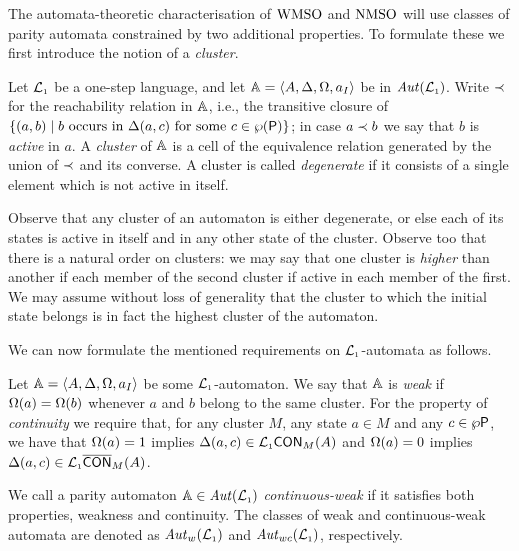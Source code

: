 The automata-theoretic characterisation of $\mathrm{WMSO}$ and $\mathrm{NMSO}$ will use classes 
of parity automata constrained by two additional properties.
To formulate these we first introduce the notion of a \emph{cluster}.

\begin{definition}
\label{d:wk}
\label{d:ctwk}
Let $\mathcal{L}_{\scriptscriptstyle 1}$ be a one-step language, and let $\mathbb{A} = \langle{A,\Delta,\Omega,a_I}\rangle$
be in $\mathit{Aut}(\mathcal{L}_{\scriptscriptstyle 1})$. 
Write $\prec$ for the reachability relation in $\mathbb{A}$, i.e., the transitive 
closure of $\{ (a,b) \mid b \text{ occurs in }\tmap(a,c) \text{ for 
some } c \in \wp(\props) \}$;
in case $a \prec b$ we say that $b$ is \emph{active} in $a$.
A \emph{cluster} of $\mathbb{A}$ is a cell of the equivalence relation generated by 
the union of $\prec$ and its converse.
A cluster is called \emph{degenerate} if it consists of a  single element which
is not active in itself.
\end{definition}

Observe that any cluster of an automaton is either degenerate, or else each
of its states is active in itself and in any other state of the cluster.
Observe too that there is a natural order on clusters: we may say that one
cluster is \emph{higher} than another if each member of the second cluster
if active in each member of the first.
We may assume without loss of generality that the cluster to which the initial 
state belongs is in fact the highest cluster of the automaton.

We can now formulate the mentioned requirements on $\mathcal{L}_{\scriptscriptstyle 1}$-automata as follows.

\begin{definition}
\label{d:wk}
\label{d:ctwk}
Let $\mathbb{A} = \langle{A,\Delta,\Omega,a_I}\rangle$ be some $\mathcal{L}_{\scriptscriptstyle 1}$-automaton.
We say that $\mathbb{A}$ is \emph{weak} if $\Omega(a) = \Omega(b)$ whenever $a$ and $b$
belong to the same cluster.
For the property of \emph{continuity} we require that, for any cluster $M$, any
state $a \in M$ and any $c \in \wp\mathsf{P}$, we have that 
$\Omega(a) = 1$ implies $\Delta(a,c) \in \mathcal{L}_{\scriptscriptstyle 1}\mathsf{CON}_{M}(A)$
and 
$\Omega(a) = 0$ implies $\Delta(a,c) \in \mathcal{L}_{\scriptscriptstyle 1}\overline{\mathsf{CON}}_{M}(A)$.

We call a parity automaton $\mathbb{A} \in \mathit{Aut}(\mathcal{L}_{\scriptscriptstyle 1})$ \emph{continuous-weak} if it 
satisfies both properties, weakness and continuity.
The classes of weak and continuous-weak automata are denoted as $\mathit{Aut}_{w}(\mathcal{L}_{\scriptscriptstyle 1})$
and $\mathit{Aut}_{wc}(\mathcal{L}_{\scriptscriptstyle 1})$, respectively.
\end{definition}

